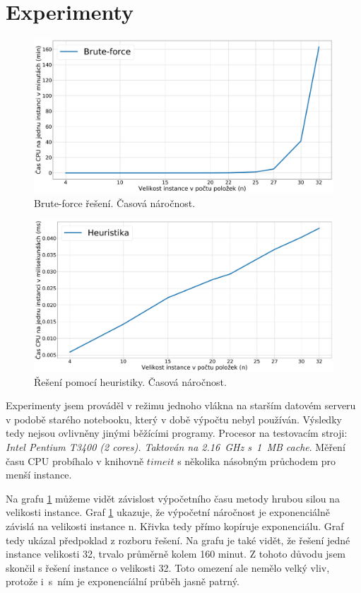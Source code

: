 \documentclass[11pt]{article}
\begin{document}
\section{Experimenty}
\begin{figure}\centering
	\includegraphics[scale=0.25]{img/1}
 	\caption[1]{Brute-force řešení. Časová náročnost.}\label{fig:1}
 \end{figure} 	
 \begin{figure}\centering
	\includegraphics[scale=0.25]{img/2}
 	\caption[2]{Řešení pomocí heuristiky. Časová náročnost.}\label{fig:2}
 \end{figure} 	
 
Experimenty jsem prováděl v režimu jednoho vlákna na starším datovém serveru v podobě starého notebooku, který v době výpočtu nebyl používán. Výsledky tedy nejsou ovlivněny jinými běžícími programy. Procesor na testovacím stroji: \textit{Intel Pentium T3400 (2 cores). Taktován na 2.16~GHz s~1~MB cache}.
Měření času CPU probíhalo v knihovně $timeit$ s několika násobným průchodem pro menší instance.

Na grafu \ref{fig:1} můžeme vidět závislost výpočetního času metody hrubou silou na velikosti instance. Graf \ref{fig:1} ukazuje, že výpočetní náročnost je exponenciálně závislá na velikosti instance n. Křivka tedy přímo kopíruje exponenciálu. Graf tedy ukázal předpoklad z rozboru řešení. Na grafu je také vidět, že řešení jedné instance velikosti 32, trvalo průměrně kolem 160 minut. Z tohoto důvodu jsem skončil s řešení instance o velikosti 32. Toto omezení ale nemělo velký vliv, protože i~s~ním je exponencíální průběh jasně patrný.
\end{document}
